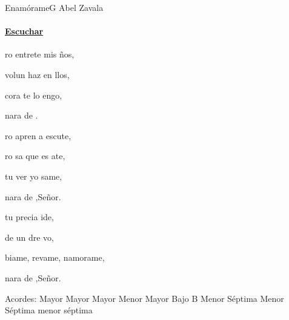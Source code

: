 \documentclass[12pt, spanish]{book}
\begin{document}
    \begin{song}{Enam\'orame}{G}
        {} %
        {Abel Zavala}
        {} %
        {}
        \ifChordBk
        \paragraph{\mbox{}\hfill\protect\href{https://open.spotify.com/intl-es/track/5kePPdU6VcqYa3yMVPr0qT}{Escuchar}\mbox{}\hfill}
        \fi

        \begin{SBOpGroup}
            ro entrete mis ños,

             volun haz en llos,

             cora te lo engo,

            nara de .
        \end{SBOpGroup}

        \begin{SBOpGroup}
            ro apren a escute,

            ro sa que es ate,

             tu ver yo same,

            nara de ,Señor.
        \end{SBOpGroup}

        \begin{SBChorus}
             tu precia  ide,

             de  un dre vo,

            biame, revame, namorame,

            nara de ,Señor.
        \end{SBChorus}

        \ifChordBk
        \begin{SBOpGroup}
            Acordes:
             Mayor \hfill
             Mayor \hfill\null\break
             Mayor \hfill
             Menor \hfill\null\break
             Mayor Bajo B \hfill
             Menor S\'eptima \hfill\null\break
             Menor S\'eptima \hfill
             menor s\'eptima \hfill\null\break
        \end{SBOpGroup}
        \fi
    \end{song}
\end{document}
